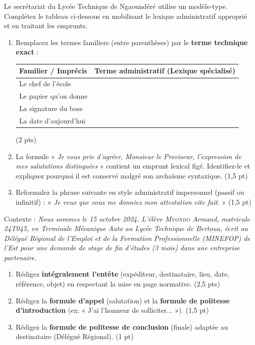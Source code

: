 \documentclass[11pt]{article}
\begin{document}
\begin{exercice}
Le secrétariat du Lycée Technique de Ngaoundéré utilise un modèle-type. Complétez le tableau ci-dessous en mobilisant le lexique administratif approprié et en traitant les emprunts.
\begin{enumerate}
    \item Remplacez les termes familiers (entre parenthèses) par le \textbf{terme technique exact} :
    \begin{tabularx}{\linewidth}{@{}lX@{}}
        \toprule
        Familier / Imprécis & Terme administratif (Lexique spécialisé) \\
        \midrule
        Le chef de l'école & \dotfill \\
        Le papier qu'on donne & \dotfill \\
        La signature du boss & \dotfill \\
        La date d'aujourd'hui & \dotfill \\
        \bottomrule
    \end{tabularx} (2 pts)
    \item La formule « \textit{Je vous prie d'agréer, Monsieur le Proviseur, l'expression de mes salutations distinguées} » contient un emprunt lexical figé. Identifiez-le et expliquez pourquoi il est conservé malgré son archaïsme syntaxique. (1,5 pt)
    \item Reformulez la phrase suivante en style administratif impersonnel (passif ou infinitif) : « \textit{Je veux que vous me donniez mon attestation vite fait.} » (1,5 pt)
\end{enumerate}
\end{exercice}

\begin{exercice}
Contexte : \textit{Nous sommes le 15 octobre 2024. L'élève \textsc{Mvondo} Armand, matricule 24T045, en Terminale Mécanique Auto au Lycée Technique de Bertoua, écrit au Délégué Régional de l'Emploi et de la Formation Professionnelle (MINEFOP) de l'Est pour une demande de stage de fin d'études (3 mois) dans une entreprise partenaire.}
\begin{enumerate}
    \item Rédigez \textbf{intégralement l'entête} (expéditeur, destinataire, lieu, date, référence, objet) en respectant la mise en page normative. (2,5 pts)
    \item Rédigez la \textbf{formule d'appel} (salutation) et la \textbf{formule de politesse d'introduction} (ex: « J'ai l'honneur de solliciter... »). (1,5 pt)
    \item Rédigez la \textbf{formule de politesse de conclusion} (finale) adaptée au destinataire (Délégué Régional). (1 pt)
\end{enumerate}
\end{exercice}
\end{document}
